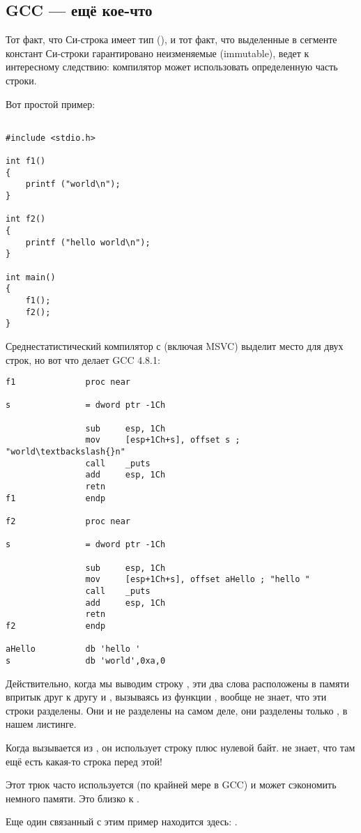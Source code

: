 \subsection{GCC --- ещё кое-что}
\label{use_parts_of_C_strings}

Тот факт, что  Си-строка имеет тип  (), 
и тот факт, что выделенные в сегменте констант Си-строки гарантировано неизменяемые (immutable), 
ведет к интересному следствию: компилятор может использовать определенную часть строки.

Вот простой пример:

\begin{lstlisting}[style=customc]

#include <stdio.h>

int f1()
{
	printf ("world\n");
}

int f2()
{
	printf ("hello world\n");
}

int main()
{
	f1();
	f2();
}
\end{lstlisting}

Среднестатистический компилятор с \CCpp (включая MSVC) выделит место для двух строк, но вот что делает GCC 4.8.1:

\begin{lstlisting}[caption=GCC 4.8.1 + листинг в IDA,style=customasmx86]
f1              proc near

s               = dword ptr -1Ch

                sub     esp, 1Ch
                mov     [esp+1Ch+s], offset s ; "world\textbackslash{}n"
                call    _puts
                add     esp, 1Ch
                retn
f1              endp

f2              proc near

s               = dword ptr -1Ch

                sub     esp, 1Ch
                mov     [esp+1Ch+s], offset aHello ; "hello "
                call    _puts
                add     esp, 1Ch
                retn
f2              endp

aHello          db 'hello '
s               db 'world',0xa,0
\end{lstlisting}

Действительно, когда мы выводим строку , 
эти два слова расположены в памяти впритык друг к другу и \puts, вызываясь из функции , вообще не знает,
что эти строки разделены. Они и не разделены на самом деле, они разделены
только , в нашем листинге.

Когда \puts вызывается из , он использует строку  плюс нулевой байт. \puts не знает, что там ещё есть какая-то строка перед этой!

Этот трюк часто используется (по крайней мере в GCC) и может сэкономить немного памяти.
Это близко к .

Еще один связанный с этим пример находится здесь: .

